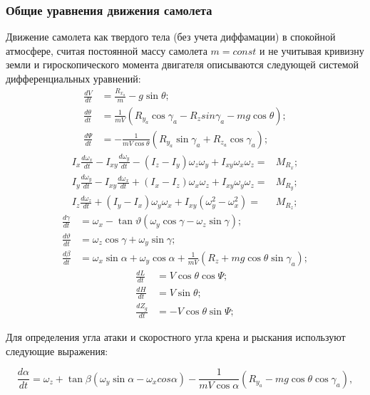 \documentclass{article}
\begin{document}
\subsubsection{Общие уравнения движения самолета}
Движение самолета как твердого тела (без учета диффамации) в спокойной атмосфере, считая постоянной массу самолета $m=const$ и не учитывая кривизну земли и гироскопического момента двигателя описываются следующей системой дифференциальных уравнений:
\begin{align*}
    \frac{dV}{dt} &= \frac{R_{x_a}}{m} - g \sin{\theta};\\
    \frac{d\theta}{dt} &= \frac{1}{mV}(R_{y_a} \cos{\gamma_a} - R_{z} sin{\gamma_a} - mg \cos{\theta});\\
    \frac{d\Psi}{dt} &= -\frac{1}{mV \cos{\theta}} (R_{y_a} \sin{\gamma_a} + R_{z_a} \cos{\gamma_a});
\end{align*}
\begin{align*}
    I_x \frac{d\omega_x}{dt} - I_{xy} \frac{d\omega_y}{dt} - (I_z - I_y) \omega_z \omega_y + I_{xy} \omega_x \omega_z =& M_{R_x};\\
    I_y \frac{d\omega_y}{dt} - I_{xy} \frac{d\omega_x}{dt} + (I_x - I_z) \omega_x \omega_z + I_{xy} \omega_y \omega_z =& M_{R_y};\\
    I_z \frac{d\omega_z}{dt} + (I_y - I_x) \omega_y \omega_x + I_{xy}(\omega_y^2 - \omega_x^2) =& M_{R_z};
\end{align*}
\begin{align*}
    \frac{d\gamma}{dt} &= \omega_x - \tan{\vartheta}(\omega_y \cos{\gamma} - \omega_z \sin{\gamma});\\
    \frac{d\vartheta}{dt}&= \omega_z \cos{\gamma} + \omega_y \sin{\gamma};\\
    \frac{d\beta}{dt} &= \omega_x \sin{\alpha} + \omega_y \cos{\alpha} + \frac{1}{mV}(R_z + mg \cos{\theta} \sin{\gamma_a});
\end{align*}
\begin{align*}
    \frac{dL}{dt} &= V\cos{\theta} \cos{\Psi};\\
    \frac{dH}{dt} &= V\sin{\theta}; \\ 
    \frac{dZ_g}{dt}&= - V \cos{\theta} \sin{\Psi};
\end{align*}

Для определения угла атаки и скоростного угла крена и рыскания используют следующие выражения:

\[
\frac{d\alpha}{dt} = \omega_z + \tan{\beta}(\omega_y \sin{\alpha} - \omega_x cos{\alpha}) - \frac{1}{mV \cos{\alpha}} (R_{y_a} - mg\cos{\theta} \cos{\gamma_a}),
\]
\end{document}
